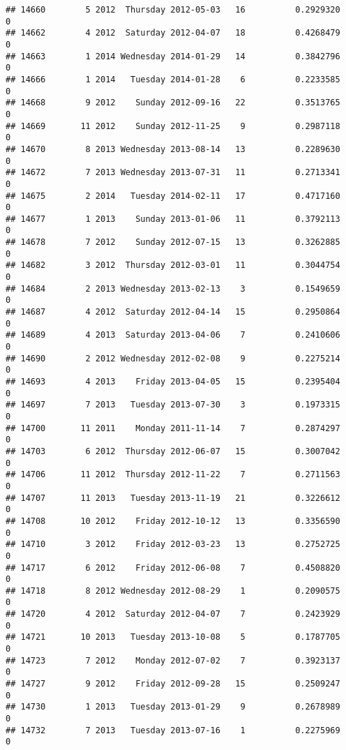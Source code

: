 \documentclass[
]{article}
\begin{document}
\begin{verbatim}
## 14660        5 2012  Thursday 2012-05-03   16          0.2929320             0
## 14662        4 2012  Saturday 2012-04-07   18          0.4268479             0
## 14663        1 2014 Wednesday 2014-01-29   14          0.3842796             0
## 14666        1 2014   Tuesday 2014-01-28    6          0.2233585             0
## 14668        9 2012    Sunday 2012-09-16   22          0.3513765             0
## 14669       11 2012    Sunday 2012-11-25    9          0.2987118             0
## 14670        8 2013 Wednesday 2013-08-14   13          0.2289630             0
## 14672        7 2013 Wednesday 2013-07-31   11          0.2713341             0
## 14675        2 2014   Tuesday 2014-02-11   17          0.4717160             0
## 14677        1 2013    Sunday 2013-01-06   11          0.3792113             0
## 14678        7 2012    Sunday 2012-07-15   13          0.3262885             0
## 14682        3 2012  Thursday 2012-03-01   11          0.3044754             0
## 14684        2 2013 Wednesday 2013-02-13    3          0.1549659             0
## 14687        4 2012  Saturday 2012-04-14   15          0.2950864             0
## 14689        4 2013  Saturday 2013-04-06    7          0.2410606             0
## 14690        2 2012 Wednesday 2012-02-08    9          0.2275214             0
## 14693        4 2013    Friday 2013-04-05   15          0.2395404             0
## 14697        7 2013   Tuesday 2013-07-30    3          0.1973315             0
## 14700       11 2011    Monday 2011-11-14    7          0.2874297             0
## 14703        6 2012  Thursday 2012-06-07   15          0.3007042             0
## 14706       11 2012  Thursday 2012-11-22    7          0.2711563             0
## 14707       11 2013   Tuesday 2013-11-19   21          0.3226612             0
## 14708       10 2012    Friday 2012-10-12   13          0.3356590             0
## 14710        3 2012    Friday 2012-03-23   13          0.2752725             0
## 14717        6 2012    Friday 2012-06-08    7          0.4508820             0
## 14718        8 2012 Wednesday 2012-08-29    1          0.2090575             0
## 14720        4 2012  Saturday 2012-04-07    7          0.2423929             0
## 14721       10 2013   Tuesday 2013-10-08    5          0.1787705             0
## 14723        7 2012    Monday 2012-07-02    7          0.3923137             0
## 14727        9 2012    Friday 2012-09-28   15          0.2509247             0
## 14730        1 2013   Tuesday 2013-01-29    9          0.2678989             0
## 14732        7 2013   Tuesday 2013-07-16    1          0.2275969             0

\end{verbatim}
\end{document}
